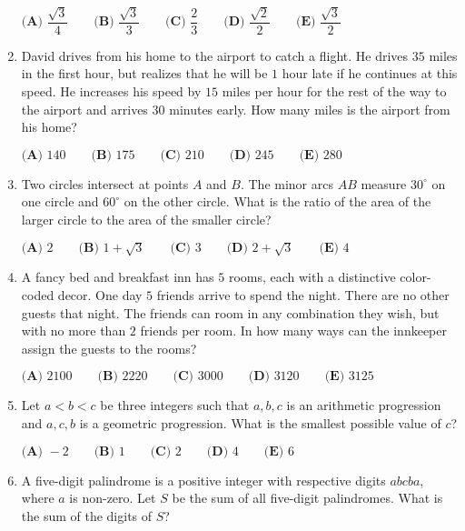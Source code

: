 \documentclass{article}
\begin{document}
\begin{enumerate}[label=\arabic*., itemsep=0.5em]
$\textbf{(A) }\dfrac{\sqrt3}4\qquad
\textbf{(B) }\dfrac{\sqrt3}3\qquad
\textbf{(C) }\dfrac23\qquad
\textbf{(D) }\dfrac{\sqrt2}2\qquad
\textbf{(E) }\dfrac{\sqrt3}2$\par \vspace{0.5em}\item David drives from his home to the airport to catch a flight.  He drives $35$ miles in the first hour, but realizes that he will be $1$ hour late if he continues at this speed.  He increases his speed by $15$ miles per hour for the rest of the way to the airport and arrives $30$ minutes early.  How many miles is the airport from his home?

$\textbf{(A) }140\qquad
\textbf{(B) }175\qquad
\textbf{(C) }210\qquad
\textbf{(D) }245\qquad
\textbf{(E) }280\qquad$\par \vspace{0.5em}\item Two circles intersect at points $A$ and $B$.  The minor arcs $AB$ measure $30^\circ$ on one circle and $60^\circ$ on the other circle.  What is the ratio of the area of the larger circle to the area of the smaller circle?

$\textbf{(A) }2\qquad
\textbf{(B) }1+\sqrt3\qquad
\textbf{(C) }3\qquad
\textbf{(D) }2+\sqrt3\qquad
\textbf{(E) }4\qquad$\par \vspace{0.5em}\item A fancy bed and breakfast inn has $5$ rooms, each with a distinctive color-coded decor.  One day $5$ friends arrive to spend the night.  There are no other guests that night.  The friends can room in any combination they wish, but with no more than $2$ friends per room.  In how many ways can the innkeeper assign the guests to the rooms?

$\textbf{(A) }2100\qquad
\textbf{(B) }2220\qquad
\textbf{(C) }3000\qquad
\textbf{(D) }3120\qquad
\textbf{(E) }3125\qquad$\par \vspace{0.5em}\item Let $a<b<c$ be three integers such that $a,b,c$ is an arithmetic progression and $a,c,b$ is a geometric progression.  What is the smallest possible value of $c$?

$\textbf{(A) }-2\qquad
\textbf{(B) }1\qquad
\textbf{(C) }2\qquad
\textbf{(D) }4\qquad
\textbf{(E) }6\qquad$\par \vspace{0.5em}\item A five-digit palindrome is a positive integer with respective digits $abcba$, where $a$ is non-zero.  Let $S$ be the sum of all five-digit palindromes.  What is the sum of the digits of $S$?


\end{enumerate}
\end{document}
